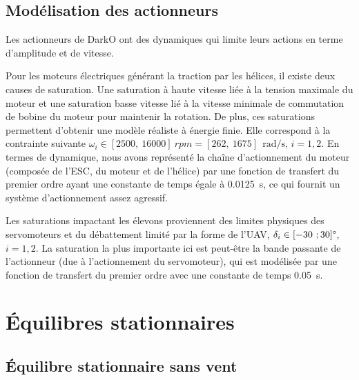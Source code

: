 \subsection{Modélisation des actionneurs}
    \label{sec:saturation}
    Les actionneurs de DarkO ont des dynamiques qui limite leurs actions en terme d'amplitude et de vitesse.

    Pour les moteurs électriques générant la traction par les hélices, il existe deux causes de saturation. Une saturation à haute vitesse liée à  la tension maximale du moteur et une saturation basse vitesse lié à la vitesse minimale de commutation de bobine du moteur pour maintenir la rotation. De plus, ces saturations permettent d'obtenir une modèle réaliste à énergie finie. Elle correspond à la contrainte suivante  $\omega_i \in [2500,~16000]~rpm = [262,~1675]~\SI{}{\radian\per\second}$, $i=1,2$. En termes de dynamique, nous avons représenté la chaîne d'actionnement du moteur (composée de l'ESC, du moteur et de l'hélice) par une fonction de transfert du premier ordre ayant une constante de temps égale à \SI{0,0125}{\second}, ce qui fournit un système d'actionnement assez agressif.

    Les saturations impactant les élevons proviennent des limites physiques des servomoteurs et du débattement limité par la forme de l'UAV, $\delta_i \in [-30~; 30]\text{\textdegree}$, $i=1,2$. La saturation la plus importante ici est peut-être la bande passante de l'actionneur (due à l'actionnement du servomoteur), qui est modélisée par une fonction de transfert du premier ordre avec une constante de temps \SI{0,05}{\second}. 

\section{Équilibres stationnaires}
    \subsection{Équilibre stationnaire sans vent}
        \label{sec:eq_nowind}

